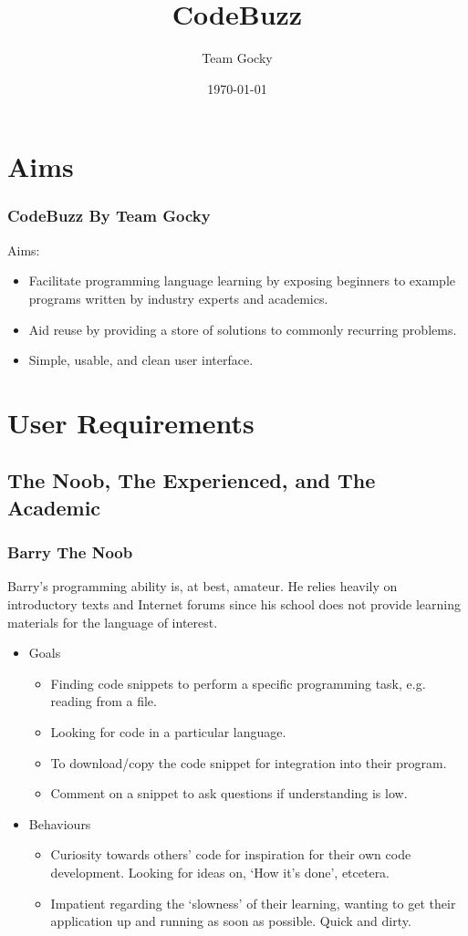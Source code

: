 \documentclass[handout, t]{beamer}
\title[DIM3 Project Presentation]{CodeBuzz}
\author{Team Gocky}
\institute{University Of Glasgow}
\date{\today}
\begin{document}
\section{Aims}

\begin{frame}
\frametitle{CodeBuzz By Team Gocky}
Aims:
\begin{itemize}
\item Facilitate programming language learning by exposing beginners to
example programs written by industry experts and academics.
\item Aid reuse by providing a store of solutions to commonly recurring
problems.
\item Simple, usable, and clean user interface.
\end{itemize}
\end{frame}

\section{User Requirements}

\subsection{The Noob, The Experienced, and The Academic}

\begin{frame}
\frametitle{Barry The Noob}
Barry's programming ability is, at best,
amateur. He relies heavily on introductory texts and Internet forums
since his school does not provide learning materials for the language
of interest.
\begin{itemize}
\item Goals
    \begin{itemize}
    \item Finding code snippets to perform a specific programming task,
    e.g. reading from a file.
    \item Looking for code in a particular language.
    \item To download/copy the code snippet for integration into their
    program.
    \item Comment on a snippet to ask questions if understanding is low.
    \end{itemize}
\item Behaviours
    \begin{itemize}
    \item Curiosity towards others' code for inspiration for their own code
    development. Looking for ideas on, `How it's done', etcetera.
    \item Impatient regarding the `slowness' of their learning, wanting to
    get their application up and running as soon as possible. Quick and
    dirty.
    \end{itemize}
\end{itemize}
\end{frame}
\end{document}
